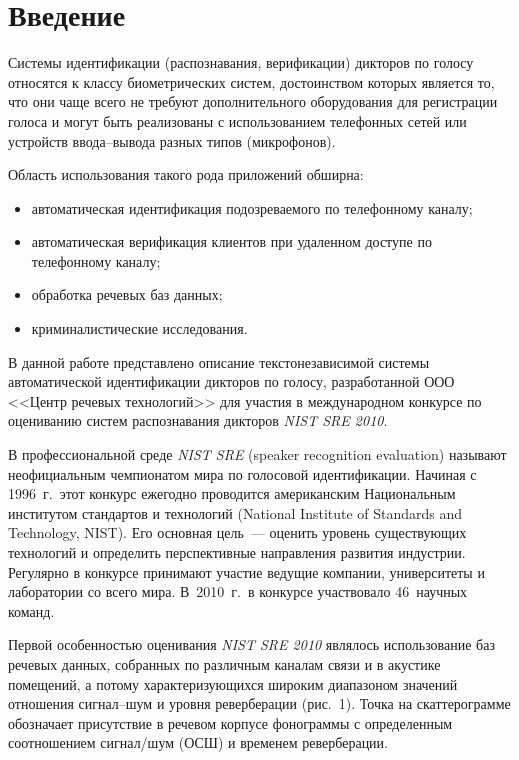       \begin{multicols}{2}
      
            \label{st\stat}

\section{Введение}

  Системы идентификации (распознавания, верификации) дикторов по голосу 
относятся к классу биометрических систем, достоинством которых является то, 
что они чаще всего не требуют дополнительного оборудования для регистрации 
голоса и могут быть реализованы с использованием телефонных сетей или 
устройств вво\-да--вы\-во\-да разных типов (микрофонов). 
  
  Область использования такого рода приложений обширна:
  \begin{itemize}
\item автоматическая идентификация подозреваемого по телефонному каналу;
\item автоматическая верификация клиентов при удаленном доступе по 
телефонному каналу;
\item обработка речевых баз данных;
\item криминалистические исследования.
\end{itemize}

  В данной работе представлено описание текстонезависимой системы 
автоматической идентификации дикторов по голосу, разработанной ООО 
<<Центр речевых технологий>> для участия в международном конкурсе по 
оцениванию систем распознавания дикторов \textit{NIST SRE 2010}.
  
  В профессиональной среде \textit{NIST SRE} (speaker recognition evaluation) 
называют неофициальным чемпионатом мира по голосовой идентификации. 
Начиная с 1996~г.\ этот конкурс ежегодно проводится американским 
Национальным институтом стандартов и технологий (National Institute of 
Standards and Technology, NIST). Его основная цель~--- оценить уровень 
существующих технологий и определить перспективные направления развития 
индустрии. Регулярно в конкурсе принимают участие ведущие компании, 
университеты и лаборатории со всего мира. В~2010~г.\ в конкурсе участвовало 
46~научных команд.
  
  Первой особенностью оценивания \textit{NIST SRE 2010} являлось 
использование баз речевых данных, собранных по различным каналам связи и в 
акустике помещений, а потому характеризующихся широким диапазоном 
значений отношения сиг\-нал--шум и уровня реверберации (рис.~1). Точка на 
скаттерограмме обозначает присутствие в речевом корпусе фонограммы с 
определенным соотношением сигнал/шум (ОСШ) и временем реверберации.


\end{multicols}

